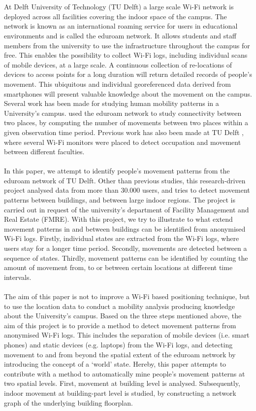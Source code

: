 \\\\
At Delft University of Technology (TU Delft) a large scale Wi-Fi network is deployed across all facilities covering the indoor space of the campus. The network is known as an international roaming service for users in educational environments and is called the eduroam network. It allows students and staff members from the university to use the infrastructure throughout the campus for free. This enables the possibility to collect Wi-Fi logs, including individual scans of mobile devices, at a large scale.  A continuous collection of re-locations of devices to access points for a long duration will return detailed records of people’s movement. This ubiquitous and individual georeferenced data derived from smartphones will present valuable knowledge about the movement on the campus. 
Several work has been made for studying human mobility patterns in a University’s campus.   \cite{Meneses} used the eduroam network to study connectivity between two places, by computing the number of movements between two places within a given observation time period. Previous work has also been made at TU Delft \cite{rythym}, where several Wi-Fi monitors were placed to detect occupation and movement between different faculties. 
\\\\
In this paper, we attempt to identify people’s movement patterns from the eduroam network of TU Delft. Other than previous studies, this research-driven project analysed data from more than 30.000 users, and tries to detect movement patterns between buildings, and between large indoor regions. The project is carried out in request of the university’s department of Facility Management and Real Estate (FMRE). With this project, we try to illustrate to what extend movement patterns in and between buildings can be identified from anonymised Wi-Fi logs. Firstly, individual states are extracted from the Wi-Fi logs, where users stay for a longer time period. Secondly, movements are detected between a sequence of states. Thirdly, movement patterns can be identified by counting the amount of movement from, to or between certain locations at different time intervals. 
\\\\
The aim of this paper is not to improve a Wi-Fi based positioning technique, but to use the location data to conduct a mobility analysis producing knowledge about the University’s campus. Based on the three steps mentioned above, the aim of this project is to provide a method to detect movement patterns from anonymised Wi-Fi logs. This includes the separation of mobile devices (i.e. smart phones) and static devices (e.g. laptops) from the Wi-Fi logs, and detecting movement to and from beyond the spatial extent of the eduroam network by introducing the concept of a ‘world’ state. Hereby, this paper attempts to contribute with a method to automatically mine people’s movement patterns at two spatial levels. First, movement at building level is analysed. Subsequently, indoor movement at building-part level is studied, by constructing a network graph of the underlying building floorplan. 
